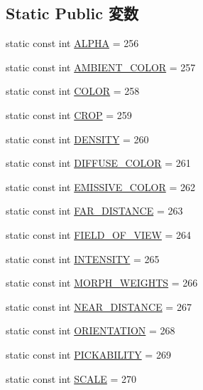 \subsection*{Static Public 変数}
\begin{CompactItemize}
\item 
static const int \hyperlink{classm3g_1_1AnimationTrack_417581fcde4067111f47320edb2aa378}{ALPHA} = 256
\item 
static const int \hyperlink{classm3g_1_1AnimationTrack_71b6e9c23b95f8011da4565f4a12f677}{AMBIENT\_\-COLOR} = 257
\item 
static const int \hyperlink{classm3g_1_1AnimationTrack_a6d8034c897057de595a4511a4e7a837}{COLOR} = 258
\item 
static const int \hyperlink{classm3g_1_1AnimationTrack_91fa562078e577c24d06faf8391b34fe}{CROP} = 259
\item 
static const int \hyperlink{classm3g_1_1AnimationTrack_7d0fe4463930d4a4b24fc47660561899}{DENSITY} = 260
\item 
static const int \hyperlink{classm3g_1_1AnimationTrack_9631242a611cf95d697c25064dba7c4f}{DIFFUSE\_\-COLOR} = 261
\item 
static const int \hyperlink{classm3g_1_1AnimationTrack_893461d45d084e5db05b159068f945d0}{EMISSIVE\_\-COLOR} = 262
\item 
static const int \hyperlink{classm3g_1_1AnimationTrack_86457ec0a2799f1f2d7ea8173a644de8}{FAR\_\-DISTANCE} = 263
\item 
static const int \hyperlink{classm3g_1_1AnimationTrack_94c1c1d2f7d48b52e3c2bcd332ed3937}{FIELD\_\-OF\_\-VIEW} = 264
\item 
static const int \hyperlink{classm3g_1_1AnimationTrack_369fe8830f39fe4aec819a371a6c9904}{INTENSITY} = 265
\item 
static const int \hyperlink{classm3g_1_1AnimationTrack_d75f3e3033e268d0a74f9533cfa9b9d6}{MORPH\_\-WEIGHTS} = 266
\item 
static const int \hyperlink{classm3g_1_1AnimationTrack_74f49e3b52778aff378dac012e59cdb2}{NEAR\_\-DISTANCE} = 267
\item 
static const int \hyperlink{classm3g_1_1AnimationTrack_c7fe423a6a639520b0b3d1c1e663784b}{ORIENTATION} = 268
\item 
static const int \hyperlink{classm3g_1_1AnimationTrack_87fcd8136941a05a8a95c61e499692e0}{PICKABILITY} = 269
\item 
static const int \hyperlink{classm3g_1_1AnimationTrack_8334f0c0c56b96debb10231b86050ead}{SCALE} = 270
\item 

\end{CompactItemize}
